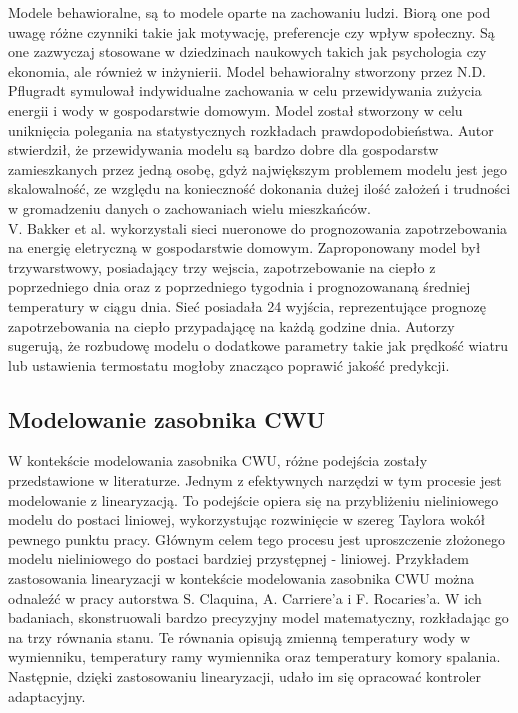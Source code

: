 \documentclass[a4paper,twoside,12pt]{book}
\begin{document}
Modele behawioralne, są to modele oparte na zachowaniu ludzi. Biorą one pod uwagę różne czynniki takie jak motywację, preferencje czy wpływ społeczny. Są one zazwyczaj stosowane w dziedzinach naukowych takich jak psychologia czy ekonomia, ale również w inżynierii. Model behawioralny stworzony przez N.D. Pflugradt\cite{bib:Behavioural} symulował indywidualne zachowania w celu przewidywania zużycia energii i wody w gospodarstwie domowym. Model został stworzony w celu uniknięcia polegania na statystycznych rozkładach prawdopodobieństwa. Autor stwierdził, że przewidywania modelu są bardzo dobre dla gospodarstw zamieszkanych przez jedną osobę, gdyż największym problemem modelu jest jego skalowalność, ze względu na konieczność dokonania dużej ilość założeń i trudności w gromadzeniu danych o zachowaniach wielu mieszkańców.\\

V. Bakker et al.\cite{bib:model_przewidywania} wykorzystali sieci nueronowe do prognozowania zapotrzebowania na energię eletryczną w gospodarstwie domowym. Zaproponowany model był trzywarstwowy, posiadający trzy wejscia, zapotrzebowanie na ciepło z poprzedniego dnia oraz z poprzedniego tygodnia i prognozowananą średniej temperatury w ciągu dnia. Sieć posiadała 24 wyjścia, reprezentujące prognozę zapotrzebowania na ciepło przypadającę na każdą godzine dnia. Autorzy sugerują, że rozbudowę modelu o dodatkowe parametry takie jak prędkość wiatru lub ustawienia termostatu mogłoby znacząco poprawić jakość predykcji.

\subsection{Modelowanie zasobnika CWU}
W kontekście modelowania zasobnika CWU, różne podejścia zostały przedstawione w literaturze. Jednym z efektywnych narzędzi w tym procesie jest modelowanie z linearyzacją. To podejście opiera się na przybliżeniu nieliniowego modelu do postaci liniowej, wykorzystując rozwinięcie w szereg Taylora wokół pewnego punktu pracy. Głównym celem tego procesu jest uproszczenie złożonego modelu nieliniowego do postaci bardziej przystępnej - liniowej. Przykładem zastosowania linearyzacji w kontekście modelowania zasobnika CWU można odnaleźć w pracy autorstwa S. Claquina, A. Carriere'a i F. Rocaries'a.\cite{bib:linearyzacja} W ich badaniach, skonstruowali bardzo precyzyjny model matematyczny, rozkładając go na trzy równania stanu. Te równania opisują zmienną temperatury wody w wymienniku, temperatury ramy wymiennika oraz temperatury komory spalania. Następnie, dzięki zastosowaniu linearyzacji, udało im się opracować kontroler adaptacyjny.
\end{document}
